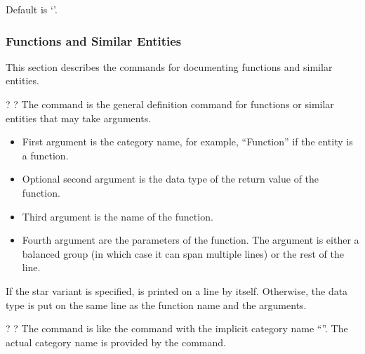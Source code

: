 \documentclass{scrartcl}
\begin{document}
{\begin{definition}
Default is ‘\code{\\normalfont\\small}’.
\end{definition}


\subsubsection{Functions and Similar Entities}

This section describes the commands for documenting functions and
similar entities.

\begin{definition}
  \code{*}\kleene? \kleene?  
The  command is the general definition command for
functions or similar entities that may take arguments.
\begin{itemize}
\item First argument  is the category name, for
example, “Function” if the entity is a function.
\item Optional second argument  is the data type of
the return value of the function.
\item Third argument  is the name of the function.
\item Fourth argument  are the parameters of the
function.  The  argument is either a balanced group
(in which case it can span multiple lines) or the rest of the line.
\end{itemize}
If the star variant is specified,  is printed on a
line by itself.  Otherwise, the data type is put on the same line as
the function name and the arguments.
\end{definition}

\begin{definition}
 \code{*}\kleene? \kleene?  
The  command is like the  command with the
implicit category name “”.  The actual category name is
provided by the  command.
\end{definition}

}
\end{document}

